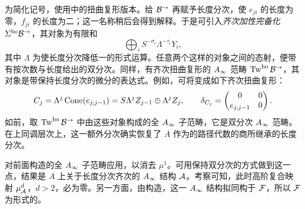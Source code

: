 为简化记号，使用中的扭曲复形版本。给 $\mathcal B^\to$ 再赋予长度分次，使 $e_{ji}$ 的长度为零，$f_{ji}$ 的长度为二；这一名称稍后会得到解释。于是可引入\emph{齐次加性完备化} $\Sigma^{\mathrm{ho}}\mathcal B^\to$，其对象为有限和
\begin{equation}\label{eq:20.7}
\bigoplus_i S^{-\sigma_i}\Lambda^{-\tau_i}Y_i,
\end{equation}
其中 $\Lambda$ 为使长度分次降低一的形式运算。任意两个这样的对象之间的态射，便带有按次数与长度给出的双分次。同样，有齐次扭曲复形的 $A_\infty$ 范畴 $\operatorname{Tw}^{\mathrm{ho}}\mathcal B^\to$，其对象是带保持长度分次的微分的表达式。例如，可将变成如下齐次扭曲复形：
\[
C_j=\Lambda^j\operatorname{Cone}(e_{j,j-1})=S\Lambda^jZ_{j-1}\oplus\Lambda^jZ_j,\qquad
\delta_{C_j}=\begin{pmatrix}0&0\\e_{j,j-1}&0\end{pmatrix}.
\]
如前，取 $\operatorname{Tw}^{\mathrm{ho}}\mathcal B^\to$ 中由这些对象构成的全 $A_\infty$ 子范畴，它是双分次 $A_\infty$ 范畴。在上同调层次上，这一额外分次确实恢复了 $A$ 作为的路径代数的商所继承的长度分次。

对前面构造的全 $A_\infty$ 子范畴应用，以消去 $\mu^1$。可用保持双分次的方式做到这一点，结果是 $A$ 上关于长度分次齐次的 $A_\infty$ 结构 $\mathcal A$。考察可知，此时高阶复合映射 $\mu_{\mathcal A}^d$，$d>2$，必为零。另一方面，由构造，这一 $A_\infty$ 结构拟同构于 $\mathcal F$，所以 $\mathcal F$ 为形式的。
